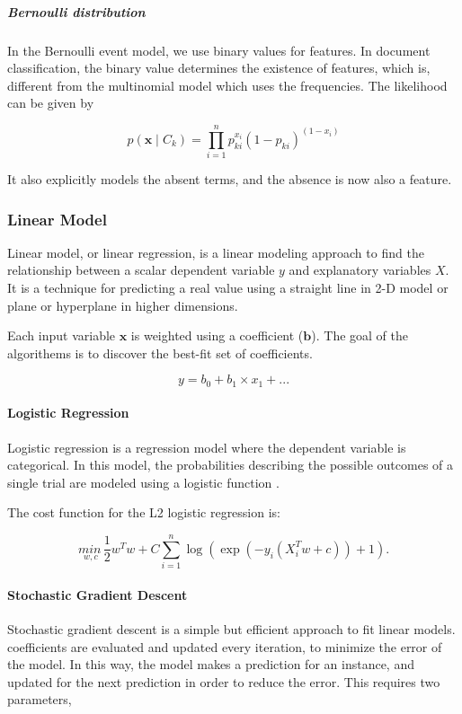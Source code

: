\documentclass[12pt,a4paper]{article}
\begin{document}
        \subparagraph{Bernoulli distribution}

        In the Bernoulli event model, we use binary values for features. In document classification, the binary value determines the existence of features, which is, different from the multinomial model which uses the frequencies. The likelihood can be given by

        $$
          p(\mathbf{x} \mid C_k) = \prod_{i=1}^n p_{ki}^{x_i} (1 - p_{ki})^{(1-x_i)}
        $$

        It also explicitly models the absent terms, and the absence is now also a feature.

    \subsubsection{Linear Model}

      Linear model, or linear regression, is a linear modeling approach to find the relationship between a scalar dependent variable $y$ and explanatory variables $X$. It is a technique for predicting a real value using a straight line in 2-D model or plane or hyperplane in higher dimensions.

      Each input variable $\mathbf{x}$ is weighted using a coefficient ($\mathbf{b}$). The goal of the algorithems is to discover the best-fit set of coefficients.

      \[
        y = b_0 + b_1 \times x_1 + ...
      \]

      \paragraph{Logistic Regression}

        Logistic regression is a regression model where the dependent variable is categorical. In this model, the probabilities describing the possible outcomes of a single trial are modeled using a logistic function \cite{lr-sklearn}.

        The cost function for the L2 logistic regression is:

        \[
          \underset{w, c}{min\,} \frac{1}{2}w^T w + C \sum_{i=1}^n \log(\exp(- y_i (X_i^T w + c)) + 1) .
        \]

      \paragraph{Stochastic Gradient Descent}

        Stochastic gradient descent is a simple but efficient approach to fit linear models. coefficients are evaluated and updated every iteration, to minimize the error of the model. In this way, the model makes a prediction for an instance, and updated for the next prediction in order to reduce the error. This requires two parameters,
\end{document}
